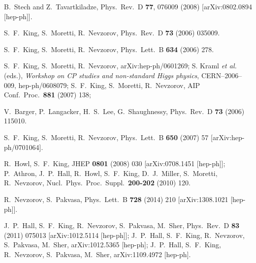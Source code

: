 \documentclass[12pt,a4paper]{article}
\begin{document}
\begin{thebibliography}{999}
B.~Stech and Z.~Tavartkiladze,
Phys.\ Rev.\  D {\bf 77}, 076009 (2008)
[arXiv:0802.0894 [hep-ph]].

S.~F.~King, S.~Moretti, R.~Nevzorov,
Phys.\ Rev.\  D {\bf 73} (2006) 035009.

S.~F.~King, S.~Moretti, R.~Nevzorov,
Phys.\ Lett.\  B {\bf 634} (2006) 278.

S.~F.~King, S.~Moretti, R.~Nevzorov,
arXiv:hep-ph/0601269;
S. Kraml {\it et al.} (eds.), {\it Workshop on CP studies and
non-standard Higgs physics}, CERN--2006--009, hep-ph/0608079;
S.~F.~King, S.~Moretti, R.~Nevzorov,
AIP Conf.\ Proc.\  {\bf 881} (2007) 138;

V.~Barger, P.~Langacker, H.~S.~Lee, G.~Shaughnessy,
Phys.\ Rev.\  D {\bf 73} (2006) 115010.

S.~F.~King, S.~Moretti, R.~Nevzorov,
Phys.\ Lett.\  B {\bf 650} (2007) 57
[arXiv:hep-ph/0701064].

R.~Howl, S.~F.~King,
JHEP {\bf 0801} (2008) 030
[arXiv:0708.1451 [hep-ph]];
P.~Athron, J.~P.~Hall, R.~Howl, S.~F.~King, D.~J.~Miller, S.~Moretti, R.~Nevzorov,
Nucl.\ Phys.\ Proc.\ Suppl.\  {\bf 200-202} (2010) 120.


R.~Nevzorov, S.~Pakvasa,
Phys.\ Lett.\ B {\bf 728} (2014) 210
[arXiv:1308.1021 [hep-ph]].

J.~P.~Hall, S.~F.~King, R.~Nevzorov, S.~Pakvasa, M.~Sher,
Phys.\ Rev.\  D {\bf 83} (2011) 075013
[arXiv:1012.5114 [hep-ph]];
J.~P.~Hall, S.~F.~King, R.~Nevzorov, S.~Pakvasa, M.~Sher,
arXiv:1012.5365 [hep-ph];
J.~P.~Hall, S.~F.~King, R.~Nevzorov, S.~Pakvasa, M.~Sher,
arXiv:1109.4972 [hep-ph].



\end{thebibliography}
\end{document}
